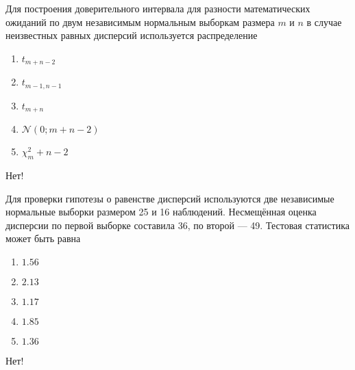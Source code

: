 \documentclass[t]{beamer}
\newcommand{\cN}{\mathcal{N}}
\begin{document}
 \begin{frame} \label{2-No} 
\begin{block}{2} 

  Для построения доверительного интервала для разности математических ожиданий по двум независимым нормальным выборкам размера $m$ и $n$ в случае неизвестных равных дисперсий используется распределение


 \end{block} 
\begin{enumerate} 
\item[] \hyperlink{2-Yes}{\beamergotobutton{} $t_{m+n-2}$}
\item[] \hyperlink{2-No}{\beamergotobutton{} $t_{m-1,n-1}$}
\item[] \hyperlink{2-No}{\beamergotobutton{} $t_{m+n}$}
\item[] \hyperlink{2-No}{\beamergotobutton{} $\cN(0;m+n-2)$}
\item[] \hyperlink{2-No}{\beamergotobutton{} $\chi^2_m+n-2$}
\end{enumerate} 

 \alert{Нет!} 
\end{frame} 


 \begin{frame} \label{3-No} 
\begin{block}{3} 

  Для проверки гипотезы о равенстве дисперсий используются две независимые нормальные выборки размером 25 и 16 наблюдений. Несмещённая оценка дисперсии по первой выборке составила 36, по второй — 49. Тестовая статистика может быть равна


 \end{block} 
\begin{enumerate} 
\item[] \hyperlink{3-No}{\beamergotobutton{} $1.56$}
\item[] \hyperlink{3-No}{\beamergotobutton{} $2.13$}
\item[] \hyperlink{3-No}{\beamergotobutton{} $1.17$}
\item[] \hyperlink{3-No}{\beamergotobutton{} $1.85$}
\item[] \hyperlink{3-Yes}{\beamergotobutton{} $1.36$}
\end{enumerate} 

 \alert{Нет!} 
\end{frame} 
\end{document}
